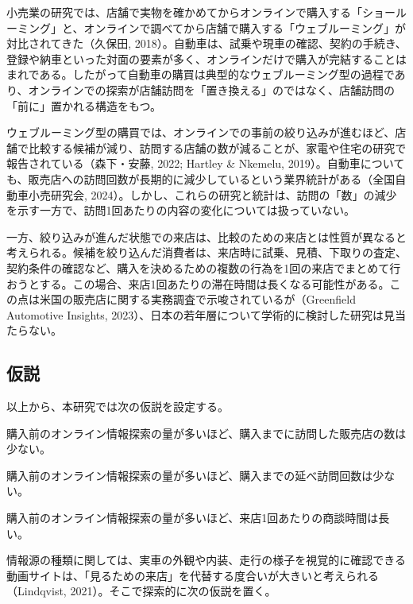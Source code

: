 小売業の研究では、店舗で実物を確かめてからオンラインで購入する「ショールーミング」と、オンラインで調べてから店舗で購入する「ウェブルーミング」が対比されてきた（久保田, 2018）。自動車は、試乗や現車の確認、契約の手続き、登録や納車といった対面の要素が多く、オンラインだけで購入が完結することはまれである。したがって自動車の購買は典型的なウェブルーミング型の過程であり、オンラインでの探索が店舗訪問を「置き換える」のではなく、店舗訪問の「前に」置かれる構造をもつ。

ウェブルーミング型の購買では、オンラインでの事前の絞り込みが進むほど、店舗で比較する候補が減り、訪問する店舗の数が減ることが、家電や住宅の研究で報告されている（森下・安藤, 2022; Hartley \& Nkemelu, 2019）。自動車についても、販売店への訪問回数が長期的に減少しているという業界統計がある（全国自動車小売研究会, 2024）。しかし、これらの研究と統計は、訪問の「数」の減少を示す一方で、訪問1回あたりの内容の変化については扱っていない。

一方、絞り込みが進んだ状態での来店は、比較のための来店とは性質が異なると考えられる。候補を絞り込んだ消費者は、来店時に試乗、見積、下取りの査定、契約条件の確認など、購入を決めるための複数の行為を1回の来店でまとめて行おうとする。この場合、来店1回あたりの滞在時間は長くなる可能性がある。この点は米国の販売店に関する実務調査で示唆されているが（Greenfield Automotive Insights, 2023）、日本の若年層について学術的に検討した研究は見当たらない。

\subsection{仮説}

以上から、本研究では次の仮説を設定する。

\begin{description}[style=nextline,leftmargin=2\zw,labelsep=0.5\zw,font=\normalfont\bfseries,itemsep=2pt]
  \item[H1] 購入前のオンライン情報探索の量が多いほど、購入までに訪問した販売店の数は少ない。
  \item[H2] 購入前のオンライン情報探索の量が多いほど、購入までの延べ訪問回数は少ない。
  \item[H3] 購入前のオンライン情報探索の量が多いほど、来店1回あたりの商談時間は長い。
\end{description}

情報源の種類に関しては、実車の外観や内装、走行の様子を視覚的に確認できる動画サイトは、「見るための来店」を代替する度合いが大きいと考えられる（Lindqvist, 2021）。そこで探索的に次の仮説を置く。

